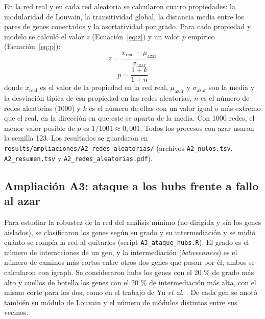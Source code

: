 En la red real y en cada red aleatoria se calcularon cuatro propiedades: la modularidad de Louvain, la transitividad global, la distancia media entre los pares de genes conectados y la asortatividad por grado. Para cada propiedad y modelo se calculó el valor $z$ (Ecuación~\ref{eq:z}) y un valor $p$ empírico (Ecuación~\ref{eq:p}):
\begin{equation}
	z = \frac{x_{\mathrm{real}} - \mu_{\mathrm{azar}}}{\sigma_{\mathrm{azar}}}
	\label{eq:z}
\end{equation}
\begin{equation}
	p = \frac{1 + k}{1 + n}
	\label{eq:p}
\end{equation}
donde $x_{\mathrm{real}}$ es el valor de la propiedad en la red real, $\mu_{\mathrm{azar}}$ y $\sigma_{\mathrm{azar}}$ son la media y la desviación típica de esa propiedad en las redes aleatorias, $n$ es el número de redes aleatorias (1000) y $k$ es el número de ellas con un valor igual o más extremo que el real, en la dirección en que este se aparta de la media. Con 1000 redes, el menor valor posible de $p$ es $1/1001 \approx 0{,}001$. Todos los procesos con azar usaron la semilla 123. Los resultados se guardaron en \texttt{results/ampliaciones/A2\_redes\_aleatorias/} (archivos \texttt{A2\_nulos.tsv}, \texttt{A2\_resumen.tsv} y \texttt{A2\_redes\_aleatorias.pdf}).


\subsection{Ampliación A3: ataque a los hubs frente a fallo al azar}

Para estudiar la robustez de la red del análisis mínimo (no dirigida y sin los genes aislados), se clasificaron los genes según su grado y su intermediación y se midió cuánto se rompía la red al quitarlos (script \texttt{A3\_ataque\_hubs.R}). El grado es el número de interacciones de un gen, y la intermediación (\textit{betweenness}) es el número de caminos más cortos entre otros dos genes que pasan por él, ambos se calcularon con igraph. Se consideraron hubs los genes con el 20 \% de grado más alto y cuellos de botella los genes con el 20 \% de intermediación más alta, con el mismo corte para los dos, como en el trabajo de Yu \textit{et al.} \cite{Yu2007}. De cada gen se anotó también su módulo de Louvain y el número de módulos distintos entre sus vecinos.

